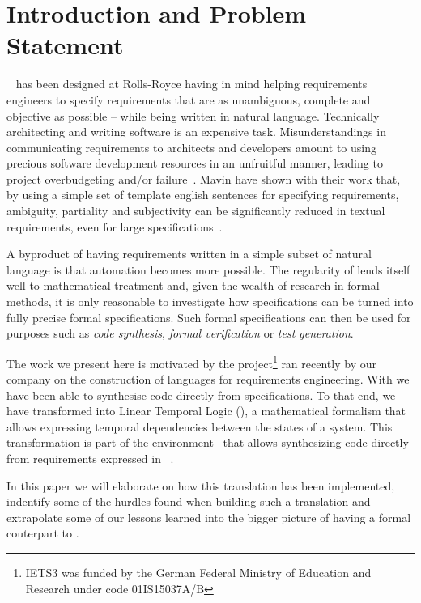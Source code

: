 \section{Introduction and Problem Statement}

\ears~\cite{EARS09} has been designed at Rolls-Royce having in mind helping
requirements engineers to specify requirements that are as unambiguous, complete
and objective as possible -- while being written in natural language.
Technically architecting and writing software is an expensive task.
Misunderstandings in communicating requirements to architects and developers
amount to using precious software development resources in an unfruitful manner,
leading to project overbudgeting and/or failure~\cite{chaos:2014}. Mavin \etal
have shown with their work that, by using a simple set of template english
sentences for specifying requirements, ambiguity, partiality and subjectivity
can be significantly reduced in textual requirements, even for large
specifications~\cite{EARS10,EARS16}.

A byproduct of having requirements written in a simple subset of natural
language is that automation becomes more possible. The regularity of \ears lends
itself well to mathematical treatment and, given the wealth of research in
formal methods, it is only reasonable to investigate how \ears specifications
can be turned into fully precise formal specifications. Such formal
specifications can then be used for purposes such as \emph{code synthesis},
\emph{formal verification} or \emph{test generation}.

The work we present here is motivated by the \iets project\footnote{IETS3 was
funded by the German Federal Ministry of Education and Research under code
01IS15037A/B} ran recently by our company on the construction of languages for
requirements engineering. With \iets we have been able to synthesise code
directly from \ears specifications. To that end, we have transformed \ears into
Linear Temporal Logic (\ltl), a mathematical formalism that allows expressing
temporal dependencies between the states of a system. This transformation is
part of the \earsctrl environment~\cite{earsctrlProcess} that allows
synthesizing code directly from requirements expressed in
\ears~\cite{LucioRCA16,LucioRAM17}.

In this paper we will elaborate on how this translation has been implemented,
indentify some of the hurdles found when building such a translation and
extrapolate some of our lessons learned into the bigger picture of having a
formal couterpart to \ears.